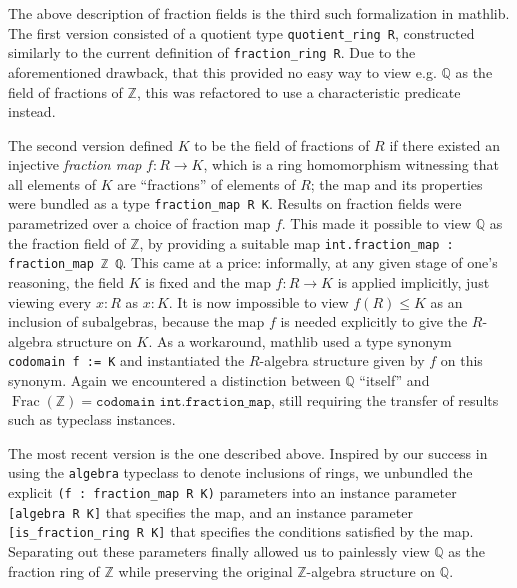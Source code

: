 \documentclass[sn-mathphys]{sn-jnl}%
\newcommand{\lean}[1]{\texttt{#1}\xspace}
\newcommand{\mathlib}{\textsf{mathlib}\xspace}
\newcommand{\QQ}{\mathbb{Q}}
\renewcommand{\Z}{\mathbb{Z}}
\DeclareMathOperator{\Frac}{Frac}
\begin{document}
The above description of fraction fields is the third such formalization in \mathlib. The first version
consisted of a quotient type \lean{quotient\_ring R},
constructed similarly to the current definition of \lean{fraction\_ring R}.
Due to the aforementioned drawback,
that this provided no easy way to view e.g. $\QQ$ as the field of fractions of $\Z$,
this was refactored to use a characteristic predicate instead.

The second version
defined $K$ to be the field of fractions of $R$ if there existed an injective \emph{fraction map} $f : R \to K$, which is a ring homomorphism witnessing that all elements of $K$ are ``fractions'' of elements of $R$;
the map and its properties were bundled as a type \lean{fraction\_map R K}.
Results on fraction fields were parametrized over a choice of fraction map $f$.
This made it possible to view $\QQ$ as the fraction field of $\Z$, by providing a suitable map \lean{int.fraction\_map : fraction\_map ℤ ℚ}.
This came at a price:
informally, at any given stage of one's reasoning, the field $K$ is fixed and the map $f\colon R\to K$ is applied implicitly, just viewing every $x:R$ as $x:K$.
It is now impossible to view $f(R) \leq K$ as an inclusion of subalgebras,
because the map $f$ is needed explicitly to give the $R$-algebra structure on $K$.
As a workaround, \mathlib used a type synonym \lean{codomain f := K} and instantiated the $R$-algebra structure given by $f$ on this synonym.
Again we encountered a distinction between $\QQ$ ``itself'' and $\Frac(\Z) = \lean{codomain int.fraction\_map}$,
still requiring the transfer of results such as typeclass instances.

The most recent version is the one described above.
Inspired by our success in using the \lean{algebra} typeclass to denote inclusions of rings,
we unbundled the explicit \lean{(f : fraction\_map R K)} parameters into
an instance parameter \lean{[algebra R K]} that specifies the map,
and an instance parameter \lean{[is\_fraction\_ring R K]} that specifies the conditions satisfied by the map.
Separating out these parameters finally allowed us to painlessly view $\QQ$ as the fraction ring of $\Z$ while preserving the original $\Z$-algebra structure on $\QQ$.
\end{document}
